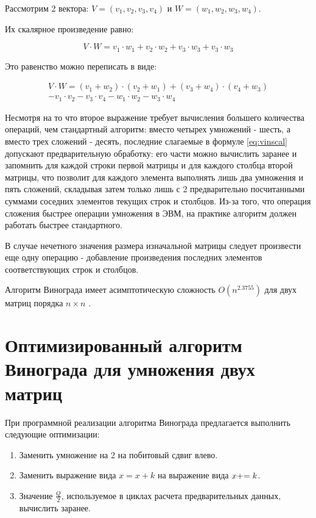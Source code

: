 Рассмотрим 2 вектора: $V = (v_1, v_2, v_3, v_4)$ и $W = (w_1, w_2, w_3, w_4)$.

Их скалярное произведение равно:

\begin{equation}
	\label{eq:vimul}
	V \cdot W = v_1 \cdot w_1 + v_2 \cdot w_2 + v_3 \cdot w_3 + v_3 \cdot w_3
\end{equation}

Это равенство можно переписать в виде:

\begin{equation}
	\label{eq:vinscal}
	\begin{gathered} 
		V \cdot W = (v_1 + w_2) \cdot (v_2 + w_1) + (v_3 + w_4) \cdot (v_4 + w_3) \\
		- v_1 \cdot v_2 - v_3 \cdot v_4 - w_1 \cdot w_2 - w_3 \cdot w_4
	\end{gathered}
\end{equation}


Несмотря на то что второе выражение требует вычисления большего количества операций, чем стандартный алгоритм: вместо четырех умножений - шесть, а вместо трех сложений - десять, последние слагаемые в формуле \ref{eq:vinscal} допускают предварительную обработку: его части можно вычислить заранее и запомнить для каждой строки первой матрицы и для каждого столбца второй матрицы, что позволит для каждого элемента выполнять лишь два умножения и пять сложений, складывая затем только лишь с 2 предварительно посчитанными суммами соседних элементов текущих строк и столбцов. Из-за того, что операция сложения быстрее операции умножения в ЭВМ, на практике алгоритм должен работать быстрее стандартного.

В случае нечетного значения размера изначальной матрицы следует произвести еще одну операцию - добавление произведения последних элементов соответствующих строк и столбцов.

Алгоритм Винограда имеет асимптотическую сложность $O(n^{2.3755})$ для двух матриц порядка $n \times n$ \cite{Vin2}.

\section{Оптимизированный алгоритм Винограда для умножения двух матриц}

При программной реализации алгоритма Винограда предлагается выполнить следующие оптимизации: 

\begin{enumerate}[label={\arabic*)}]
	\item Заменить умножение на 2 на побитовый сдвиг влево.
	\item Заменить выражение вида $x = x + k$ на выражение вида $x +\kern-0.25em= k$.
	\item Значение $\frac{Q}{2}$, используемое в циклах расчета предварительных данных, вычислить заранее.
\end{enumerate}

